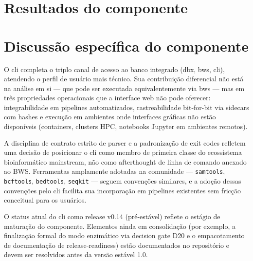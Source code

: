 
\section{Resultados do componente}
\label{sec:c4-resultados}



\section{Discussão específica do componente}
\label{sec:c4-discussao}

O \gls{cli} completa o triplo canal de acesso ao banco integrado (\gls{dbx}, \gls{bws}, \gls{cli}), atendendo o perfil de usuário mais técnico. Sua contribuição diferencial não está na análise em si --- que pode ser executada equivalentemente via \gls{bws} --- mas em três propriedades operacionais que a interface web não pode oferecer: integrabilidade em pipelines automatizados, rastreabilidade bit-for-bit via sidecars com hashes e execução em ambientes onde interfaces gráficas não estão disponíveis (containers, clusters HPC, notebooks Jupyter em ambientes remotos).

A disciplina de contrato estrito de parser e a padronização de exit codes refletem uma decisão de posicionar o \gls{cli} como membro de primeira classe do ecossistema bioinformático mainstream, não como afterthought de linha de comando anexado ao BWS. Ferramentas amplamente adotadas na comunidade --- \texttt{samtools}, \texttt{bcftools}, \texttt{bedtools}, \texttt{seqkit} --- seguem convenções similares, e a adoção dessas convenções pelo \gls{cli} \biorempp{} facilita sua incorporação em pipelines existentes sem fricção conceitual para os usuários.

O status atual do \gls{cli} como release v0.14 (pré-estável) reflete o estágio de maturação do componente. Elementos ainda em consolidação (por exemplo, a finalização formal do modo enzimático via decision gate D20 e o empacotamento de documentação de release-readiness) estão documentados no repositório e devem ser resolvidos antes da versão estável 1.0.

